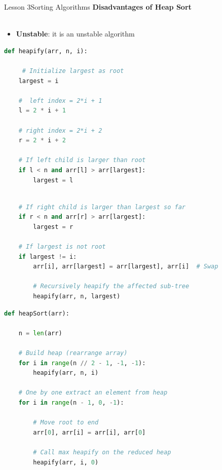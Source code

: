 \documentclass[aspectratio=1610]{beamer}
\begin{document}
\begin{frame}{Lesson 3}{Sorting Algorithms}
\LARGE
\textbf{Disadvantages of Heap Sort}\\~\\
\Large
\begin{itemize}
	\item \textbf{Unstable}: it is an unstable algorithm
\end{itemize}

\end{frame}


\begin{frame}[fragile]
\begin{lstlisting}[language=Python]
def heapify(arr, n, i):
    
     # Initialize largest as root
    largest = i 
    
    #  left index = 2*i + 1
    l = 2 * i + 1 
    
    # right index = 2*i + 2
    r = 2 * i + 2  

    # If left child is larger than root
    if l < n and arr[l] > arr[largest]:
        largest = l

  \end{lstlisting}
\end{frame}


\begin{frame}[fragile]
\begin{lstlisting}[language=Python]

    # If right child is larger than largest so far
    if r < n and arr[r] > arr[largest]:
        largest = r

    # If largest is not root
    if largest != i:
        arr[i], arr[largest] = arr[largest], arr[i]  # Swap

        # Recursively heapify the affected sub-tree
        heapify(arr, n, largest)
\end{lstlisting}
\end{frame}



\begin{frame}[fragile]
\begin{lstlisting}[language=Python]
def heapSort(arr):
    
    n = len(arr) 

    # Build heap (rearrange array)
    for i in range(n // 2 - 1, -1, -1):
        heapify(arr, n, i)

    # One by one extract an element from heap
    for i in range(n - 1, 0, -1):
      
        # Move root to end
        arr[0], arr[i] = arr[i], arr[0] 

        # Call max heapify on the reduced heap
        heapify(arr, i, 0)
\end{lstlisting}
\end{frame}
\end{document}
